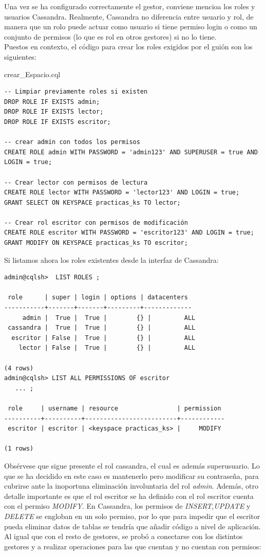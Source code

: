 \documentclass{article}
\begin{document}
Una vez se ha configurado correctamente el gestor, conviene mencioa los roles y usuarios Cassandra. Realmente, Cassandra no diferencia entre usuario y rol, de manera que un rolo puede actuar como usuario si tiene permiso login o como un conjunto de permisos (lo que es rol en otros gestores) si no lo tiene. 
\\
Puestos en contexto, el código para crear los roles exigidos por el guión son los siguientes:
\begin{scriptbox}{crear\_Espacio.cql}
\begin{verbatim}
-- Limpiar previamente roles si existen 
DROP ROLE IF EXISTS admin;
DROP ROLE IF EXISTS lector;
DROP ROLE IF EXISTS escritor;

-- crear admin con todos los permisos
CREATE ROLE admin WITH PASSWORD = 'admin123' AND SUPERUSER = true AND LOGIN = true;

-- Crear lector con permisos de lectura
CREATE ROLE lector WITH PASSWORD = 'lector123' AND LOGIN = true;
GRANT SELECT ON KEYSPACE practicas_ks TO lector;

-- Crear rol escritor con permisos de modificación
CREATE ROLE escritor WITH PASSWORD = 'escritor123' AND LOGIN = true;
GRANT MODIFY ON KEYSPACE practicas_ks TO escritor;
\end{verbatim}
\end{scriptbox}
Si listamos ahora los roles existentes desde la interfaz de Cassandra:
\begin{tcolorbox}[colback=black, coltext=white, fontupper=\ttfamily, title=Terminal]
\begin{verbatim}
admin@cqlsh>  LIST ROLES ;

 role      | super | login | options | datacenters
-----------+-------+-------+---------+-------------
     admin |  True |  True |        {} |         ALL
 cassandra |  True |  True |        {} |         ALL
  escritor | False |  True |        {} |         ALL
    lector | False |  True |        {} |         ALL

(4 rows)
admin@cqlsh> LIST ALL PERMISSIONS OF escritor
   ... ;

 role     | username | resource                | permission
----------+----------+-------------------------+------------
 escritor | escritor | <keyspace practicas_ks> |     MODIFY

(1 rows)
\end{verbatim}
\end{tcolorbox}
Obsérvese que sigue presente el rol cassandra, el cual es además superusuario. Lo que se ha decidido en este caso es mantenerlo pero modificar su contraseña, para cubrirse ante la inoportuna eliminación involuntaria del rol \textit{admin}. Además, otro detalle importante es que el rol escritor se ha definido con el rol escritor cuenta con el permiso \textit{MODIFY}. En Cassandra, los permisos de \textit{INSERT},\textit{UPDATE} y \textit{DELETE} se engloban en un solo permiso, por lo que para impedir que el escritor pueda eliminar datos de tablas se tendría que añadir código a nivel de aplicación.
\\
Al igual que con el resto de gestores, se probó a conectarse con los distintos gestores y a realizar operaciones para las que cuentan y no cuentan con permisos:
\end{document}
